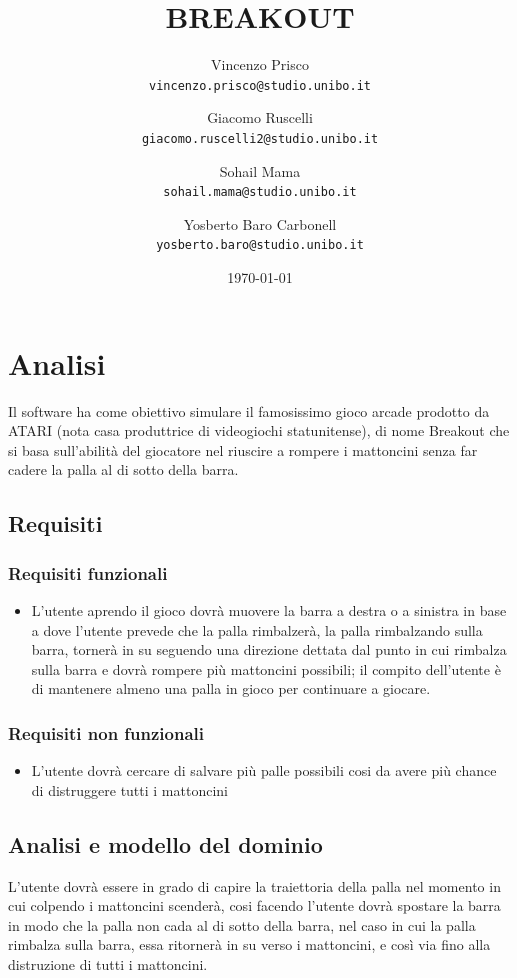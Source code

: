 \documentclass[a4paper,12pt]{report}
\title{\textbf{BREAKOUT}}
\author{Vincenzo Prisco\\
\texttt{vincenzo.prisco@studio.unibo.it}
\and Giacomo Ruscelli\\
\texttt{giacomo.ruscelli2@studio.unibo.it}
\and Sohail Mama\\
\texttt{sohail.mama@studio.unibo.it}
\and Yosberto Baro Carbonell\\
\texttt{yosberto.baro@studio.unibo.it}}
\date{\today}
\begin{document}
\maketitle
\newpage

\tableofcontents

\newpage

\chapter{Analisi}
Il software ha come obiettivo simulare il famosissimo gioco arcade prodotto da ATARI (nota casa produttrice di videogiochi statunitense), di nome Breakout che si basa sull’abilità del giocatore nel riuscire a rompere i mattoncini senza far cadere la palla al di sotto della barra.
\section{Requisiti}
\subsection{Requisiti funzionali}
\begin{itemize}
    \item L’utente aprendo il gioco dovrà muovere la barra a destra o a sinistra in base a dove l’utente prevede che la palla rimbalzerà, la palla rimbalzando sulla barra, tornerà in su seguendo una direzione dettata dal punto in cui rimbalza sulla barra e dovrà rompere più mattoncini possibili; il compito dell'utente è di mantenere almeno una palla in gioco per continuare a giocare.
\end{itemize}

\subsection{Requisiti non funzionali}
\begin{itemize}
    \item L'utente dovrà cercare di salvare più palle possibili cosi da avere più chance di distruggere tutti i mattoncini
\end{itemize}
\section{Analisi e modello del dominio}
L'utente dovrà essere in grado di capire la traiettoria della palla nel momento in cui colpendo i mattoncini scenderà, cosi facendo l'utente dovrà spostare la barra in modo che la palla non cada al di sotto della barra, nel caso in cui la palla rimbalza sulla barra, essa ritornerà in su verso i mattoncini, e così via fino alla distruzione di tutti i mattoncini.
\end{document}
